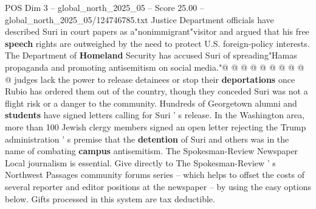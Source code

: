 \begin{textsample}{POS Dim 3 – global\_north\_2025\_05 – Score 25.00 – global\_north\_2025\_05/124746785.txt}
Justice Department officials have described Suri in court papers as a"nonimmigrant"visitor and argued that his free \textbf{speech} rights are outweighed by the need to protect U.S. foreign-policy interests.
The Department of \textbf{Homeland} Security has accused Suri of spreading"Hamas propaganda and promoting antisemitism on social media."@ @ @ @ @ @ @ @ @ @ judges lack the power to release detainees or stop their \textbf{deportations} once Rubio has ordered them out of the country, though they conceded Suri was not a flight risk or a danger to the community.
Hundreds of Georgetown alumni and \textbf{students} have signed letters calling for Suri ' s release.
In the Washington area, more than 100 Jewish clergy members signed an open letter rejecting the Trump administration ' s premise that the \textbf{detention} of Suri and others was in the name of combating \textbf{campus} antisemitism.
The Spokesman-Review Newspaper Local journalism is essential.
Give directly to The Spokesman-Review ' s Northwest Passages community forums series -- which helps to offset the costs of several reporter and editor positions at the newspaper -- by using the easy options below.
Gifts processed in this system are tax deductible.

\end{textsample}
